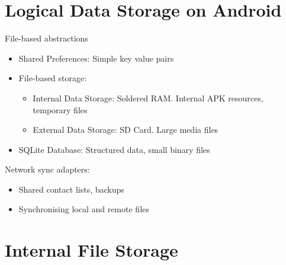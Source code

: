 \documentclass{article}
\begin{document}
\tableofcontents

\newpage

\section{Logical	Data	Storage	on	Android}

\begin{flushleft}
File-based abstractions
\begin{itemize}
  \item Shared Preferences: Simple key value pairs
  \item File-based storage:
  \begin{itemize}
    \item Internal Data Storage: Soldered RAM. Internal APK resources, temporary files
    \item External Data Storage: SD Card. Large media files
  \end{itemize}
  \item SQLite Database: Structured data, small binary files
\end{itemize}
Network sync adapters:
\begin{itemize}
  \item Shared contact lists, backups
  \item Synchronising local and remote files
\end{itemize}
\end{flushleft}

\section{Internal File Storage}
\end{document}
